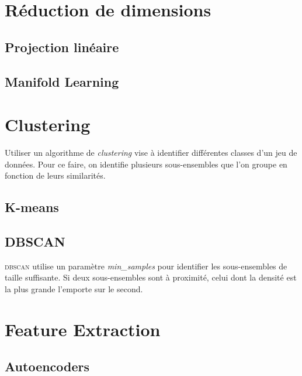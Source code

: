 \documentclass[../../cs-notes.tex]{subfiles}
\begin{document}
	\chapter{Réduction de dimensions}
	\section{Projection linéaire}
	\section{Manifold Learning}


	\chapter{Clustering}
	Utiliser un algorithme de \textit{clustering} vise à identifier différentes classes d'un jeu de données. Pour ce faire, on identifie plusieurs sous-ensembles que l'on groupe en fonction de leurs similarités.

	\section{K-means}


	\section{DBSCAN}
	\textsc{dbscan} utilise un paramètre \textit{min\_samples} pour identifier les sous-ensembles de taille suffisante. Si deux sous-ensembles sont à proximité, celui dont la densité est la plus grande l'emporte sur le second.


	\chapter{Feature Extraction}

	\section{Autoencoders}

	
\end{document}
